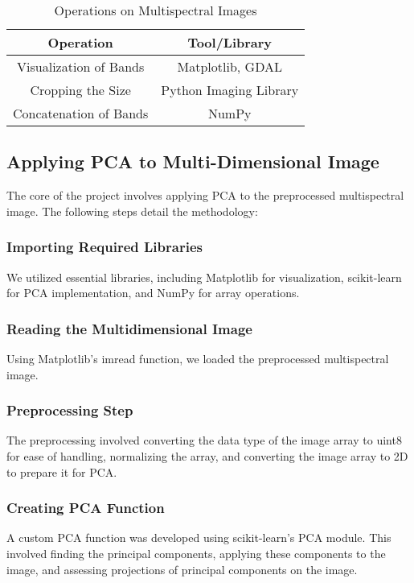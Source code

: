 \documentclass[conference]{IEEEtran}
\begin{document}
\begin{table}[H]
    \caption{Operations on Multispectral Images}
    \begin{center}
        \begin{tabular}{|c|c|}
            \hline
            \textbf{Operation} & \textbf{Tool/Library} \\
            \hline
            Visualization of Bands & Matplotlib, GDAL \\
            \hline
            Cropping the Size & Python Imaging Library \\
            \hline
            Concatenation of Bands & NumPy \\
            \hline
        \end{tabular}
    \end{center}
\end{table}

\subsection{Applying PCA to Multi-Dimensional Image}
The core of the project involves applying PCA to the preprocessed multispectral image. The following steps detail the methodology:

\subsubsection{Importing Required Libraries}
We utilized essential libraries, including Matplotlib for visualization, scikit-learn for PCA implementation, and NumPy for array operations.

\subsubsection{Reading the Multidimensional Image}
Using Matplotlib's imread function, we loaded the preprocessed multispectral image.

\subsubsection{Preprocessing Step}
The preprocessing involved converting the data type of the image array to uint8 for ease of handling, normalizing the array, and converting the image array to 2D to prepare it for PCA.

\subsubsection{Creating PCA Function}
A custom PCA function was developed using scikit-learn's PCA module. This involved finding the principal components, applying these components to the image, and assessing projections of principal components on the image.
\end{document}
